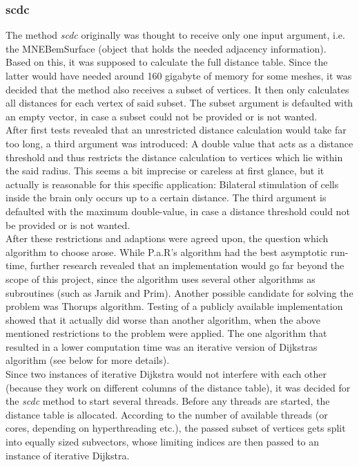 \subsubsection{scdc}
The method \textit{scdc} originally was thought to receive only one input argument, i.e. the MNEBemSurface (object that holds the needed adjacency information). Based on this, it was supposed to calculate the full distance table. Since the latter would have needed around 160 gigabyte of memory for some meshes, it was decided that the method also receives a subset of vertices. It then only calculates all distances for each vertex of said subset. The subset argument is defaulted with an empty vector, in case a subset could not be provided or is not wanted.\\
After first tests revealed that an unrestricted distance calculation would take far too long, a third argument was introduced: A double value that acts as a distance threshold and thus restricts the distance calculation to vertices which lie within the said radius. This seems a bit imprecise or careless at first glance, but it actually is reasonable for this specific application: Bilateral stimulation of cells inside the brain only occurs up to a certain distance. The third argument is defaulted with the maximum double-value, in case a distance threshold could not be provided or is not wanted.\\
After these restrictions and adaptions were agreed upon, the question which algorithm to choose arose.
While P.a.R's algorithm had the best asymptotic run-time, further research revealed that an implementation would go far beyond the scope of this project, since the algorithm uses several other algorithms as subroutines (such as Jarnik and Prim). Another possible candidate for solving the problem was Thorups algorithm. Testing of a publicly available implementation showed that it actually did worse than another algorithm, when the above mentioned restrictions to the problem were applied. The one algorithm that resulted in a lower computation time was an iterative version of Dijkstras algorithm (see below for more details).\\
Since two instances of iterative Dijkstra would not interfere with each other (because they work on different columns of the distance table), it was decided for the \textit{scdc} method to start several threads. Before any threads are started, the distance table is allocated. According to the number of available threads (or cores, depending on hyperthreading etc.), the passed subset of vertices gets split into equally sized subvectors, whose limiting indices are then passed to an instance of iterative Dijkstra. 

